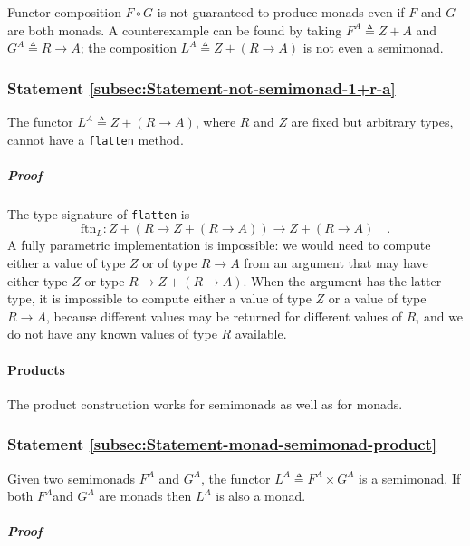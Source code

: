 Functor composition $F\circ G$ is not guaranteed to produce monads
even if $F$ and $G$ are both monads. A counterexample can be found
by taking $F^{A}\triangleq Z+A$ and $G^{A}\triangleq R\rightarrow A$;
the composition $L^{A}\triangleq Z+\left(R\rightarrow A\right)$ is
not even a semimonad.

\subsubsection{Statement \label{subsec:Statement-not-semimonad-1+r-a}\ref{subsec:Statement-not-semimonad-1+r-a}}

The functor $L^{A}\triangleq Z+\left(R\rightarrow A\right)$, where
$R$ and $Z$ are fixed but arbitrary types, cannot have a \lstinline!flatten!
method.

\subparagraph{Proof}

The type signature of \lstinline!flatten! is
\[
\text{ftn}_{L}:Z+\left(R\rightarrow Z+\left(R\rightarrow A\right)\right)\rightarrow Z+\left(R\rightarrow A\right)\quad.
\]
A fully parametric implementation is impossible: we would need to
compute either a value of type $Z$ or of type $R\rightarrow A$ from
an argument that may have either type $Z$ or type $R\rightarrow Z+\left(R\rightarrow A\right)$.
When the argument has the latter type, it is impossible to compute
either a value of type $Z$ or a value of type $R\rightarrow A$,
because different values may be returned for different values of $R$,
and we do not have any known values of type $R$ available. 

\paragraph{Products}

The product construction works for semimonads as well as for monads.

\subsubsection{Statement \label{subsec:Statement-monad-semimonad-product}\ref{subsec:Statement-monad-semimonad-product}}

Given two semimonads $F^{A}$ and $G^{A}$, the functor $L^{A}\triangleq F^{A}\times G^{A}$
is a semimonad. If both $F^{A}$and $G^{A}$ are monads then $L^{A}$
is also a monad.

\subparagraph{Proof}

